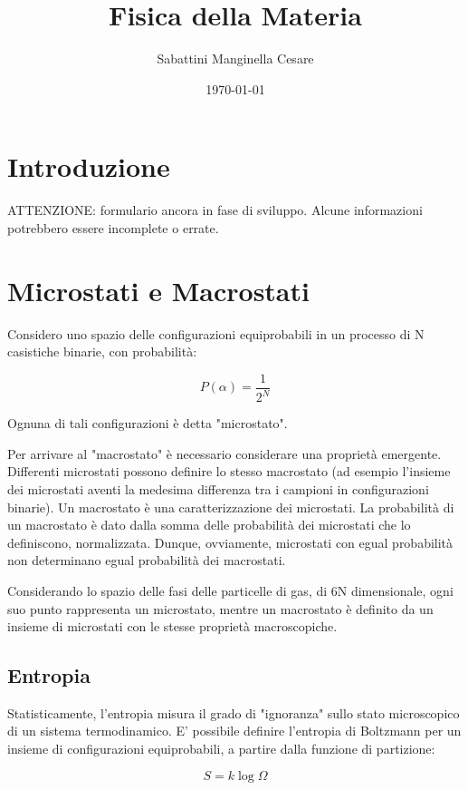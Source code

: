\documentclass{article}
\title{Fisica della Materia}
\author{Sabattini Manginella Cesare}
\date{\today}
\begin{document}
\maketitle

\section{Introduzione}
ATTENZIONE: formulario ancora in fase di sviluppo. Alcune informazioni potrebbero essere incomplete o errate.

\section{Microstati e Macrostati}
Considero uno spazio delle configurazioni equiprobabili in un processo di N casistiche binarie, con probabilità:

\begin{equation}
    P(\alpha) = \frac{1}{2^N}
\end{equation}

Ognuna di tali configurazioni è detta "microstato".

Per arrivare al "macrostato" è necessario considerare una proprietà emergente.
Differenti microstati possono definire lo stesso macrostato (ad esempio l'insieme dei microstati aventi la medesima differenza tra i campioni in configurazioni binarie).
Un macrostato è una caratterizzazione dei microstati.
La probabilità di un macrostato è dato dalla somma delle probabilità dei microstati che lo definiscono, normalizzata.
Dunque, ovviamente, microstati con egual probabilità non determinano egual probabilità dei macrostati.

Considerando lo spazio delle fasi delle particelle di gas, di 6N dimensionale, ogni suo punto rappresenta un microstato, mentre un macrostato è definito da un insieme di microstati con le stesse proprietà macroscopiche.


\subsection{Entropia}
Statisticamente, l'entropia misura il grado di "ignoranza" sullo stato microscopico di un sistema termodinamico.
E' possibile definire l'entropia di Boltzmann per un insieme di configurazioni equiprobabili, a partire dalla funzione di partizione:

\begin{equation}
    S = k \log \Omega
\end{equation}
\end{document}
